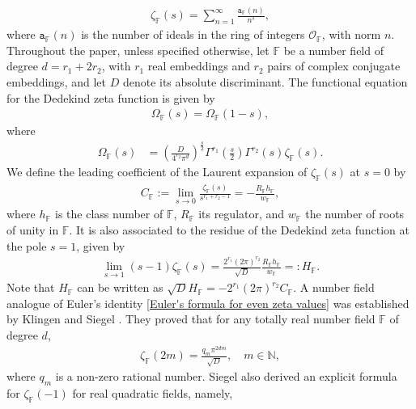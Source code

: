 \documentclass[12pt,reqno]{amsart}
\renewcommand{\(}{\left\(}
\renewcommand{\)}{\right\)}
\renewcommand{\[}{\left\[}
\renewcommand{\]}{\right\]}
\numberwithin{equation}{section}
\theoremstyle{plain}
\begin{document}
\begin{align*}
\zeta_{\mathbb{F}}(s) = \sum_{n=1}^{\infty}\frac{\mathtt{a}_{\mathbb{F}}(n)}{n^s},
\end{align*}
where $\mathtt{a}_{\mathbb{F}}(n)$ is the number of ideals in the ring of integers $\mathcal{O}_{\mathbb{F}}$, with norm $n$. Throughout the paper, unless specified otherwise, let $\mathbb{F}$ be a number field of degree $d = r_1 + 2r_2$, with $r_1$ real embeddings and $r_2$ pairs of complex conjugate embeddings, and let $D$ denote its absolute discriminant.
The functional equation for the Dedekind zeta function is given by 
\begin{align}\label{Dedekind_zeta_functional_equation}
\Omega_{\mathbb{F}}(s) = \Omega_{\mathbb{F}}(1-s),
\end{align}
where 
\begin{align}\label{Omega_F of fnal eqn}
\Omega_{\mathbb{F}}(s) &= \left(\frac{D}{4^{r_2}\pi^d}\right)^{\frac{s}{2}}\Gamma^{r_1}\left(\frac{s}{2}\right)\Gamma^{r_2}(s)\zeta_{\mathbb{F}}(s).
\end{align}
We define the leading coefficient of the Laurent expansion of $\zeta_{\mathbb{F}}(s)$ at $s=0$ by
\begin{align}\label{Laurent series_at s=0_1st coeff}
C_{\mathbb{F}} := \lim_{s\rightarrow 0} \frac{\zeta_{\mathbb{F}}(s)}{s^{r_1+r_2-1}} = - \frac{R_\mathbb{F} h_\mathbb{F}}{w_\mathbb{F}},
\end{align}
where $h_\mathbb{F}$ is the class number of $\mathbb{F}$, $R_\mathbb{F}$ its regulator, and $w_\mathbb{F}$ the number of roots of unity in $\mathbb{F}$. It is also associated to the residue of the Dedekind zeta function at the pole $s=1$, given by
\begin{align}\label{Laurent series_at s=1_1st coeff}
\lim_{s\to1}(s-1)\zeta_{\mathbb{F}}(s) = \frac{2^{r_1}(2\pi)^{r_2}}{\sqrt{D}}\frac{R_\mathbb{F} h_\mathbb{F}}{w_\mathbb{F}} =: H_{\mathbb{F}}.
\end{align}
Note that $H_{\mathbb{F}}$ can be written as $\sqrt{D}H_{\mathbb{F}} = -2^{r_1}(2\pi)^{r_2}C_{\mathbb{F}}$.
A number field analogue of Euler’s identity \eqref{Euler's formula for even zeta values}
was established by Klingen \cite{Klingen} and Siegel \cite{Siegel}. They proved that for any totally real number field $\mathbb{F}$ of degree $d$,
\begin{align*}
\zeta_{\mathbb{F}}(2m) = \frac{q_m \pi^{2dm}}{\sqrt{D}}, \quad m \in \mathbb{N},
\end{align*}
where $q_m$ is a non-zero rational number.
Siegel also derived an explicit formula for $\zeta_{\mathbb{F}}(-1)$ for real quadratic fields, namely,
\end{document}
